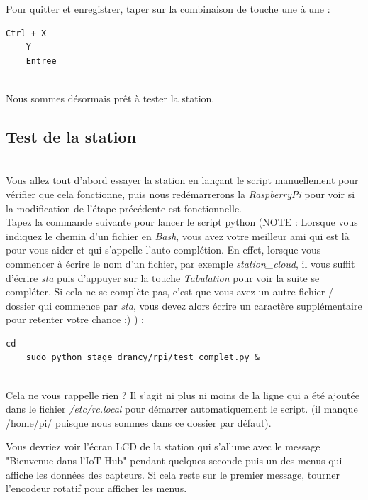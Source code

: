 Pour quitter et enregistrer, taper sur la combinaison de touche une à une :\\

\begin{lstlisting}[style=MyBashStyle]
	Ctrl + X
	Y
	Entree
\end{lstlisting}\\

Nous sommes désormais prêt à tester la station.

\subsection{Test de la station}\\

Vous allez tout d'abord essayer la station en lançant le script manuellement pour vérifier que cela fonctionne, puis nous redémarrerons la \textit{RaspberryPi} pour voir si la modification de l'étape précédente est fonctionnelle.\\

Tapez la commande suivante pour lancer le script python (NOTE : Lorsque vous indiquez le chemin d'un fichier en \textit{Bash}, vous avez votre meilleur ami qui est là pour vous aider et qui s'appelle l'auto-complétion. En effet, lorsque vous commencer à écrire le nom d'un fichier, par exemple \textit{station_cloud}, il vous suffit d'écrire \textit{sta} puis d'appuyer sur la touche \textit{Tabulation} pour voir la suite se compléter. Si cela ne se complète pas, c'est que vous avez un autre fichier / dossier qui commence par \textit{sta}, vous devez alors écrire un caractère supplémentaire pour retenter votre chance ;) ) :\\

\begin{lstlisting}[style=MyBashStyle]
	cd
	sudo python stage_drancy/rpi/test_complet.py &
\end{lstlisting}\\

Cela ne vous rappelle rien ? Il s'agit ni plus ni moins de la ligne qui a été ajoutée dans le fichier \textit{/etc/rc.local} pour démarrer automatiquement le script. (il manque /home/pi/ puisque nous sommes dans ce dossier par défaut).

Vous devriez voir l'écran LCD de la station qui s'allume avec le message "Bienvenue dans l'IoT Hub" pendant quelques seconde puis un des menus qui affiche les données des capteurs. Si cela reste sur le premier message, tourner l'encodeur rotatif pour afficher les menus.

